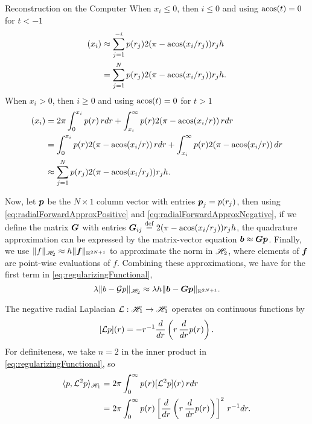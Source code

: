 \begin{chapter}{Reconstruction on the Computer}
When $x_i \le 0$, then $i \le 0$ and using $\operatorname*{acos}(t) = 0$ for $t<-1$
\begin{align}
  [\G p](x_i) 
    &\approx \sum_{j=1}^{-i} p(r_j)2(\pi - \acos(x_i/r_j)) r_jh \nonumber\\
    &= \sum_{j=1}^{N} p(r_j)2(\pi - \acos(x_i/r_j)) r_jh. \label{eq:radialForwardApproxPositive}
\end{align}
When $x_i > 0$, then $i \ge 0$ and using $\operatorname*{acos}(t) = 0$ for $t>1$ 
\begin{align}
  [\G p](x_i) 
    &= 2\pi \int_0^{x_i} p(r)\,rdr + \int_{x_i}^\infty p(r)2(\pi - \acos(x_i/r))\,rdr\nonumber \\
    &= \int_0^{x_i} p(r) 2(\pi - \acos(x_i/r))\,rdr + \int_{x_i}^\infty p(r)2(\pi - \acos(x_i/r))\,dr\nonumber \\
    &\approx \sum_{j=1}^{N} p(r_j)2(\pi - \acos(x_i/r_j)) r_jh. \label{eq:radialForwardApproxNegative}
\end{align}

Now, let $\mbox{\boldmath$p$}$ be the $N\times 1$ column vector with entries $\mbox{\boldmath$p$}_j = p(r_j)$, then using \eqref{eq:radialForwardApproxPositive} and \eqref{eq:radialForwardApproxNegative}, if we define the matrix $\mbox{\boldmath$G$}$ with entries $\mbox{\boldmath$G$}_{ij} \stackrel{\rm def}{=} 2(\pi - \operatorname*{acos}(x_i/r_j)) r_j h$, the quadrature approximation can be expressed by the matrix-vector equation $\mbox{\boldmath$b$} \approx \mbox{\boldmath$G$} \mbox{\boldmath$p$}$.
Finally, we use $\|f\|_{\mathscr H_2} \approx h\|\mbox{\boldmath$f$}\|_{\mathbb R^{2N+1}}$ to approximate the norm in $\mathscr H_2$, where elements of $\mbox{\boldmath$f$}$ are point-wise evaluations of $f$.
Combining these approximations, we have for the first term in \eqref{eq:regularizingFunctional},
\begin{equation}
  \lambda \|b - \mathcal G p\|_{\mathscr H_2} \approx \lambda h \|\mbox{\boldmath$b$} - \mbox{\boldmath$G$} \mbox{\boldmath$p$}\|_{\mathbb R^{2N+1}}.
\end{equation}

The negative radial Laplacian $\mathcal L: \mathscr H_1 \to \mathscr H_1$ operates on continuous functions by
\begin{equation} \label{eq:radialLaplacian}
  [\mathcal L p](r) = -r^{-1}\frac{d}{dr}\left(r \,\frac{d}{dr}p(r)\right). 
\end{equation}
For definiteness, we take $n=2$ in the inner product in \eqref{eq:regularizingFunctional}, so
\begin{align} 
  \langle p, \mathcal L^2 p \rangle_{\mathscr H_1}
  &= 2\pi\int_0^\infty p(r) [\mathcal L^2 p](r) \, rdr \nonumber\\
  &= 2\pi\int_0^\infty p(r) \left[\frac{d}{dr}\left(r \,\frac{d}{dr}p(r)\right)\right]^2 \, r^{-1}dr.
  \label{eq:infiniteRadialInnerProduct}
\end{align}


\end{chapter}
